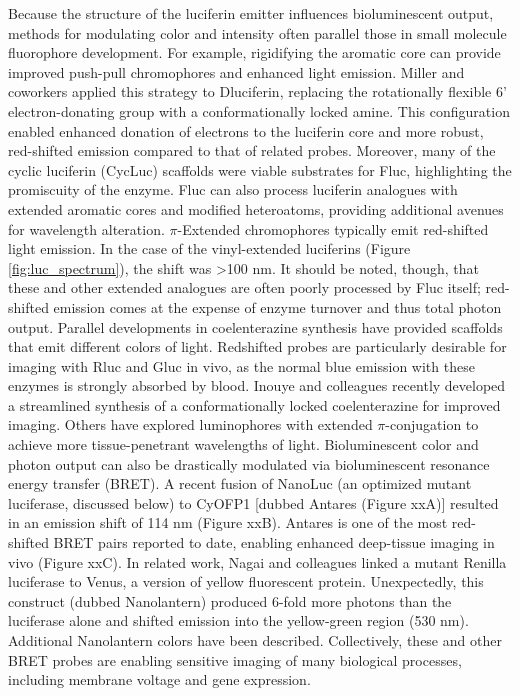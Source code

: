 Because the structure of the luciferin emitter influences
bioluminescent output, methods for modulating color and
intensity often parallel those in small molecule fluorophore
development. For example, rigidifying the aromatic core can
provide improved push-pull chromophores and enhanced
light emission. Miller and coworkers applied this strategy to Dluciferin,
replacing the rotationally flexible 6' electron-donating
group with a conformationally locked amine.\cite{Reddy:2010gaa} This configuration
enabled enhanced donation of electrons to the luciferin
core and more robust, red-shifted emission compared to that of\cite{Chu:2016im}
related probes. Moreover, many of the cyclic luciferin (CycLuc)
scaffolds were viable substrates for Fluc, highlighting the
promiscuity of the enzyme.
Fluc can also process luciferin analogues with extended
aromatic cores and modified heteroatoms, providing additional
avenues for wavelength alteration.\cite{McCutcheon:2012ixb,Woodroofe:2012vx,RN100} $\pi$-Extended chromophores
typically emit red-shifted light emission.\cite{Kuchimaru:2016eba} In the case of
the vinyl-extended luciferins (Figure \ref{fig:luc_spectrum}), the shift was >100 nm.
It should be noted, though, that these and other extended
analogues are often poorly processed by Fluc itself; red-shifted
emission comes at the expense of enzyme turnover and thus
total photon output.
Parallel developments in coelenterazine synthesis have
provided scaffolds that emit different colors of light. Redshifted
probes are particularly desirable for imaging with Rluc
and Gluc in vivo, as the normal blue emission with these
enzymes is strongly absorbed by blood.\cite{Zhao:2005if} Inouye and colleagues
recently developed a streamlined synthesis of a conformationally
locked coelenterazine for improved imaging.\cite{Hosoya:2015iu} Others have
explored luminophores with extended $\pi$-conjugation to achieve
more tissue-penetrant wavelengths of light.\cite{Nishihara:2014cr,Grinstead:2016gh}
Bioluminescent color and photon output can also be
drastically modulated via bioluminescent resonance energy
transfer (BRET). A recent fusion of NanoLuc (an optimized
mutant luciferase, discussed below) to CyOFP1 [dubbed
Antares (Figure xxA)] resulted in an emission shift of 114 nm
(Figure xxB).\cite{Chu:2016im} Antares is one of the most red-shifted BRET
pairs reported to date, enabling enhanced deep-tissue imaging
in vivo (Figure xxC). In related work, Nagai and colleagues
linked a mutant Renilla luciferase to Venus, a version of yellow
fluorescent protein.\cite{Saito:2012gs} Unexpectedly, this construct (dubbed
Nanolantern) produced 6-fold more photons than the
luciferase alone and shifted emission into the yellow-green
region (530 nm). Additional Nanolantern colors have been
described.\cite{Suzuki:2016jw} Collectively, these and other BRET probes are
enabling sensitive imaging of many biological processes,
including membrane voltage\cite{Inagaki:2017kj} and gene expression.\cite{Horikiri:2017bt}
